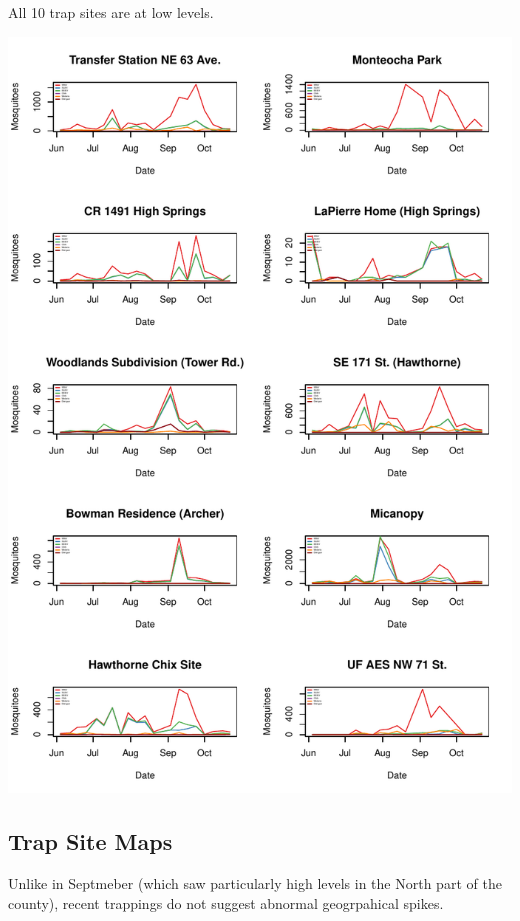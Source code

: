 \documentclass{article}
\begin{document}
All 10 trap sites are at low levels.
\begin{center}
\includegraphics{mosq28oct13-006}
\end{center}
\newpage

\begin{center}
\section*{Trap Site Maps}

\end{center}

Unlike in Septmeber (which saw particularly high levels in the North part of the county), recent trappings do not suggest abnormal geogrpahical spikes.
\end{document}
